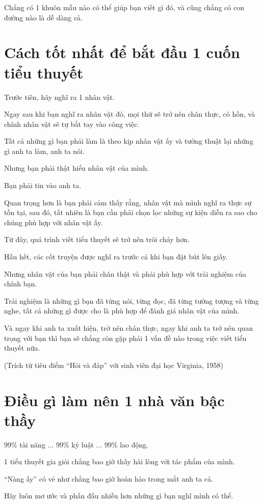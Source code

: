 \documentclass{book}
\numberwithin{equation}{section}
\begin{document}
\textsf{Chẳng có 1 khuôn mẫu nào có thể giúp bạn viết gì đó, và cũng chẳng có con đường nào là dễ dàng cả.}

\section{Cách tốt nhất để bắt đầu 1 cuốn tiểu thuyết}
Trước tiên, hãy nghĩ ra 1 nhân vật.

Ngay sau khi bạn nghĩ ra nhân vật đó, mọi thứ sẽ trở nên chân thực, có hồn, và chính nhân vật sẽ tự bắt tay vào công việc.

Tất cả những gì bạn phải làm là theo kịp nhân vật ấy và tường thuật lại những gì anh ta làm, anh ta nói.

Nhưng bạn phải thật hiểu nhân vật của mình.

Bạn phải tin vào anh ta.

Quan trọng hơn là bạn phải cảm thấy rằng, nhân vật mà mình nghĩ ra thực sự tồn tại, sau đó, tất nhiên là bạn cần phải chọn lọc những sự kiện diễn ra sao cho chúng phù hợp với nhân vật ấy.

Từ đây, quá trình viết tiểu thuyết sẽ trở nên trôi chảy hơn.

Hầu hết, các cốt truyện được nghĩ ra trước cả khi bạn đặt bút lên giấy.

%
Nhưng nhân vật của bạn phải chân thật và phải phù hợp với trải nghiệm của chính bạn.

Trải nghiệm là những gì bạn đã từng nói, từng đọc, đã từng tưởng tượng và từng nghe, tất cả những gì được cho là phù hợp để đánh giá nhân vật của mình.

Và ngay khi anh ta xuất hiện, trở nên chân thực, ngay khi anh ta trở nên quan trọng với bạn thì bạn sẽ chẳng còn gặp phải 1 vấn đề nào trong việc viết tiểu thuyết nữa.

(Trích từ tiêu điểm ``Hỏi và đáp'' với sinh viên đại học Virginia, 1958)

\section{Điều gì làm nên 1 nhà văn bậc thầy}
99\% tài năng $\ldots$ 99\% kỷ luật $\ldots$ 99\% lao động.

1 tiểu thuyết gia giỏi chẳng bao giờ thấy hài lòng với tác phẩm của mình.

``Nàng ấy'' có vẻ như chẳng bao giờ hoàn hảo trong mắt anh ta cả.

Hãy luôn mơ ước và phấn đấu nhiều hơn những gì bạn nghĩ mình có thể.
\end{document}

